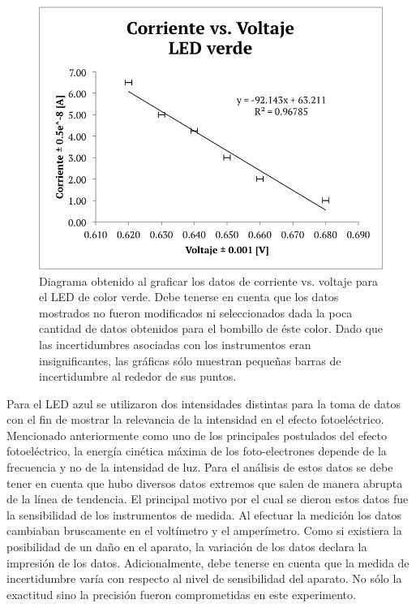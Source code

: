 \documentclass[%
 reprint,
 amsmath,amssymb,
 aps,
]{revtex4-1}
\begin{document}
\begin{figure}[H]
    \centering
    \includegraphics[scale= 0.6]{VERDE.png}
    \caption{Diagrama obtenido al graficar los datos de corriente vs. voltaje para el LED de color verde. Debe tenerse en cuenta que los datos mostrados no fueron modificados ni seleccionados dada la poca cantidad de datos obtenidos para el bombillo de éste color. Dado que las incertidumbres asociadas con los instrumentos eran insignificantes, las gráficas sólo muestran pequeñas barras de incertidumbre al rededor de sus puntos.}
    \label{fig:verde}
\end{figure}

Para el LED azul se utilizaron dos intensidades distintas para la toma de datos con el fin de mostrar la relevancia de la intensidad en el efecto fotoeléctrico. Mencionado anteriormente como uno de los principales postulados del efecto fotoeléctrico, la energía cinética máxima de los foto-electrones depende de la frecuencia y no de la intensidad de luz. Para el análisis de estos datos se debe tener en cuenta que hubo diversos datos extremos que salen de manera abrupta de la línea de tendencia. El principal motivo por el cual se dieron estos datos fue la sensibilidad de los instrumentos de medida. Al efectuar la medición los datos cambiaban bruscamente en el voltímetro y el amperímetro. Como si existiera la posibilidad de un daño en el aparato, la variación de los datos declara la impresión de los datos. Adicionalmente, debe tenerse en cuenta que la medida de incertidumbre varía con respecto al nivel de sensibilidad del aparato. No sólo la exactitud sino la precisión fueron comprometidas en este experimento.
\end{document}
